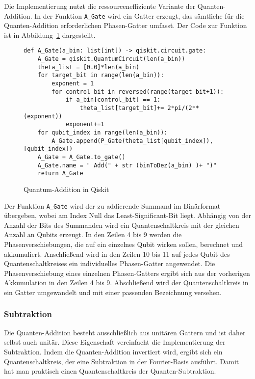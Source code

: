 Die Implementierung nutzt die ressourceneffiziente Variante der Quanten-Addition.
In der Funktion \texttt{A\_Gate} wird ein Gatter erzeugt, 
das sämtliche für die Quanten-Addition erforderlichen Phasen-Gatter umfasst.
Der Code zur Funktion ist in Abbildung~\ref{code:QuantumAdd} dargestellt.
\begin{figure}[H]
  \caption{Quantum-Addition in Qiskit}
  \label{code:QuantumAdd}
\begin{verbatim}    
def A_Gate(a_bin: list[int]) -> qiskit.circuit.gate:
    A_Gate = qiskit.QuantumCircuit(len(a_bin))
    theta_list = [0.0]*len(a_bin)
    for target_bit in range(len(a_bin)):
        exponent = 1
        for control_bit in reversed(range(target_bit+1)):
            if a_bin[control_bit] == 1:
                theta_list[target_bit]+= 2*pi/(2**(exponent))
            exponent+=1
    for qubit_index in range(len(a_bin)):
        A_Gate.append(P_Gate(theta_list[qubit_index]),[qubit_index])
    A_Gate = A_Gate.to_gate()
    A_Gate.name = " Add(" + str (binToDez(a_bin) )+ ")"
    return A_Gate 
  \end{verbatim}
\end{figure}
Der Funktion \texttt{A\_Gate} wird der zu addierende Summand im Binärformat übergeben, 
wobei am Index Null das Least-Significant-Bit liegt.
Abhängig von der Anzahl der Bits des Summanden wird ein Quantenschaltkreis mit der gleichen Anzahl an Qubits erzeugt. 
In den Zeilen 4 bis 9 werden die Phasenverschiebungen, die auf ein einzelnes Qubit wirken sollen, berechnet und akkumuliert.
Anschließend wird in den Zeilen 10 bis 11 auf jedes Qubit des Quantenschaltkreises ein individuelles Phasen-Gatter angewendet.
Die Phasenverschiebung eines einzelnen Phasen-Gatters ergibt sich aus der vorherigen Akkumulation in den Zeilen 4 bis 9.
Abschließend wird der Quantenschaltkreis in ein Gatter umgewandelt und mit einer passenden Bezeichnung versehen.

\subsubsection{Subtraktion}
Die Quanten-Addition besteht ausschließlich aus unitären Gattern 
und ist daher selbst auch unitär. 
Diese Eigenschaft vereinfacht die Implementierung der Subtraktion. 
Indem die Quanten-Addition invertiert wird, ergibt sich ein Quantenschaltkreis, 
der eine Subtraktion in der Fourier-Basis ausführt. 
Damit hat man praktisch einen Quantenschaltkreis der Quanten-Subtraktion.

